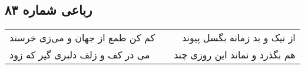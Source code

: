 \begin{center}
\section*{رباعی شماره ۸۳}
\label{sec:sh083}
\begin{longtable}{l p{0.5cm} r}
کم کن طمع از جهان و می‌زی خرسند
&&
از نیک و بد زمانه بگسل پیوند
\\
می در کف و زلف دلبری گیر که زود
&&
هم بگذرد و نماند این روزی چند
\\
\end{longtable}
\end{center}
